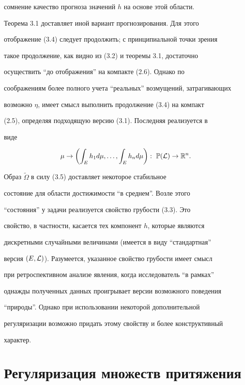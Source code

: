 сомнение качество прогноза значений $h$ на основе этой области.


Теорема 3.1 доставляет иной вариант прогнозирования. Для этого


отображение (3.4) следует продолжить; с принципиальной точки зрения


такое продолжение, как видно из (3.2) и теоремы 3.1, достаточно


осуществить ``до отображения'' на компакте (2.6). Однако по


соображениям более полного учета ``реальных'' возмущений, затрагивающих


возможно $\eta$, имеет смысл выполнить продолжение (3.4) на компакт


(2.5), определяя подходящую версию (3.1). Последняя реализуется в


виде


%


\begin{equation}


\mu \to\biggl(\int_E h_1d\mu,\dotsc,\int_E h_n d\mu\biggr): \ {\Bbb


P}({\cal L}) \to {\Bbb R}^n.


\end{equation}


%


Образ $\tilde\Omega$ в силу (3.5) доставляет некоторое стабильное


состояние для области достижимости ``в среднем''. Возле этого


``состояния'' у задачи реализуется свойство грубости (3.3). Это


свойство, в частности, касается тех компонент $h$, которые являются


дискретными случайными величинами (имеется в виду ``стандартная''


версия $(E, {\cal L})$). Разумеется, указанное свойство грубости имеет смысл


при ретроспективном анализе явления, когда исследователь ``в рамках''


однажды полученных данных проигрывает версии возможного поведения


``природы''. Однако при использовании некоторой дополнительной


регуляризации возможно придать этому свойству и более конструктивный


характер.





\section{Регуляризация множеств притяжения}





